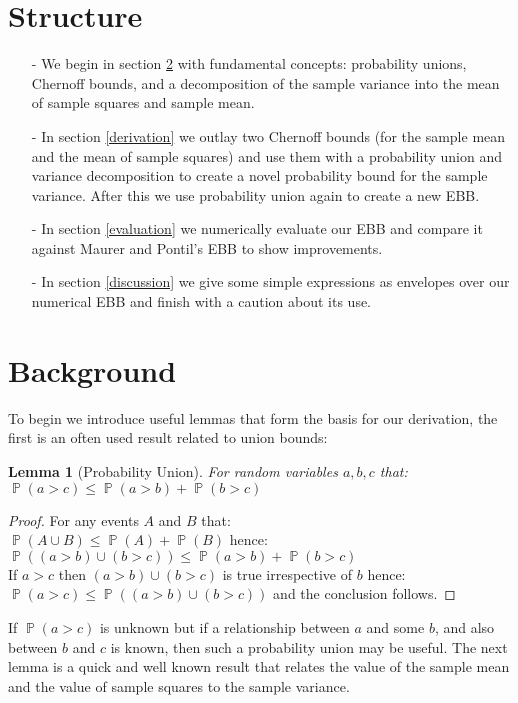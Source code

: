 \documentclass[aap,preprint]{imsart}
\newtheorem{lemma}{Lemma}
\DeclareMathOperator{\p}{\mathbb{P}}
\begin{document}
\section{Structure}

\begin{itemize}{\leftmargin=1em}
\item[-] We begin in section \ref{background} with fundamental concepts: probability unions, Chernoff bounds, and a decomposition of the sample variance into the mean of sample squares and sample mean.
\item[-] In section \ref{derivation} we outlay two Chernoff bounds (for the sample mean and the mean of sample squares) and use them with a probability union and variance decomposition to create a novel probability bound for the sample variance. After this we use probability union again to create a new EBB.
\item[-] In section \ref{evaluation} we numerically evaluate our EBB and compare it against Maurer and Pontil's EBB to show improvements.
\item[-] In section \ref{discussion} we give some simple expressions as envelopes over our numerical EBB and finish with a caution about its use.
\end{itemize}

\section{Background}\label{background}

To begin we introduce useful lemmas that form the basis for our derivation, the first is an often used result related to union bounds:

\begin{lemma}[Probability Union]\label{prob_union}
For random variables $a,b,c$ that:\\ $\p(a>c) \le \p(a>b) + \p(b>c)$
\end{lemma}
\begin{proof}
For any events $A$ and $B$ that:\\
$\p(A\cup B)\le \p(A)+\p(B)$
hence:\\
$\p((a>b) \cup (b>c))\le \p(a>b) + \p(b>c)$\\
If $a>c$ then $(a>b) \cup (b>c)$ is true irrespective of $b$ hence:\\
$\p(a>c) \le \p((a>b) \cup (b>c))$ and the conclusion follows.
\end{proof}

If $\p(a>c)$ is unknown but if a relationship between $a$ and some $b$, and also between $b$ and $c$ is known, then such a probability union may be useful.
The next lemma is a quick and well known result that relates the value of the sample mean and the value of sample squares to the sample variance.
\end{document}
